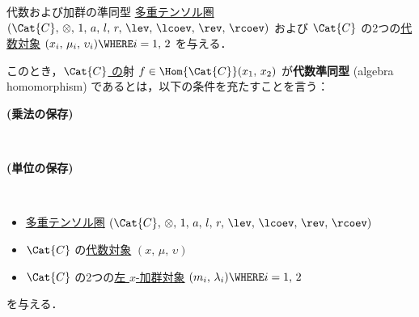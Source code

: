 \documentclass[TQFT_main]{subfiles}
\begin{document}
\begin{mydef}[label=def:hom-algmod]{代数および加群の準同型}
    \hyperref[def:tensorfusion-cat]{多重テンソル圏} $(\Cat{C},\, \otimes,\, 1,\, a,\, l,\, r,\, \lev,\, \lcoev,\, \rev,\, \rcoev)$ 
    および $\Cat{C}$ の2つの\hyperref[def:algobj]{代数対象} $(x_i,\, \mu_i,\, \upsilon_i) \WHERE i = 1,\, 2$ を与える．

    このとき，\underline{$\Cat{C}$ の}射 $f \in \Hom{\Cat{C}} (x_1,\, x_2)$ が\textbf{代数準同型} (algebra homomorphism) であるとは，以下の条件を充たすことを言う：
    \begin{description}
        \item[\textbf{(乗法の保存)}]　
        
        \begin{center}
        \end{center}
        
        \item[\textbf{(単位の保存)}]　
        
        \begin{center}
        \end{center}
        
    \end{description}
    
    \tcblower

        \begin{itemize}
            \item \hyperref[def:tensorfusion-cat]{多重テンソル圏} $(\Cat{C},\, \otimes,\, 1,\, a,\, l,\, r,\, \lev,\, \lcoev,\, \rev,\, \rcoev)$ 
            \item $\Cat{C}$ の\hyperref[def:algobj]{代数対象} $(x,\, \mu,\, \upsilon)$
            \item $\Cat{C}$ の2つの\hyperref[def:moduleobj]{左 $x$-加群対象} $(m_i,\, \lambda_i) \WHERE i = 1,\, 2$
        \end{itemize}
        を与える．


\end{mydef}
\end{document}
